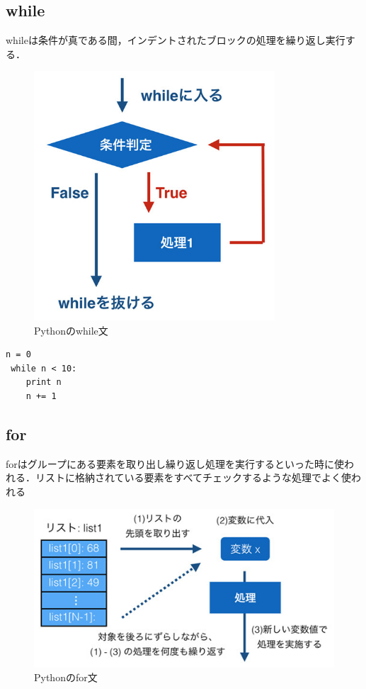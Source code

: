 \documentclass[11pt]{jarticle}
\begin{document}
\subsection{while}
whileは条件が真である間，インデントされたブロックの処理を繰り返し実行する．
\begin{figure}[h]
 \centering
  \includegraphics[width=9cm]{003.jpg}
  \caption{Pythonのwhile文}
  \label{scale}
\end{figure}

\newpage
\begin{lstlisting}[basicstyle=\ttfamily\footnotesize, frame=single]
 n = 0
 while n < 10:
 	print n
	n += 1
\end{lstlisting}

\subsection{for}
forはグループにある要素を取り出し繰り返し処理を実行するといった時に使われる．リストに格納されている要素をすべてチェックするような処理でよく使われる
\begin{figure}[h]
 \centering
  \includegraphics[width=12cm]{002.jpg}
  \caption{Pythonのfor文}
  \label{scale}
\end{figure}
\end{document}
